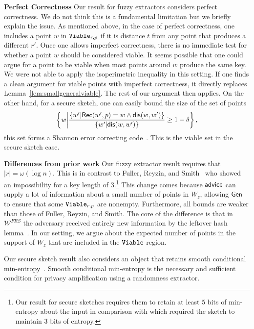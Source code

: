 \noindent \textbf{Perfect Correctness}
Our result for fuzzy extractors considers perfect correctness. We do not think this is a fundamental limitation but we briefly explain the issue. As mentioned above, in the case of perfect correctness, one includes a point $w$ in $\mathtt{Viable}_{r,p}$ if it is distance $t$ from any point that produces a different $r'$.  Once one allows imperfect correctness, there is no immediate test for whether a point $w$ should be considered viable. It seems possible that one could argue for a point to be viable when most points around $w$ produce the same key. We were not able to apply the isoperimetric inequality in this setting. If one finds a clean argument for viable points with imperfect correctness, it directly replaces Lemma~\ref{lem:smallgeneralviable}. The rest of our argument then applies. On the other hand, for a secure sketch, one can easily bound the size of the set of points \[ \left\{w \middle |  \frac{\{w' |{\mathsf{Rec}}(w', p) = w \wedge \mathsf{dis}(w, w')\}}{\{w' | \mathsf{dis}(w, w')\}}\ge 1-\delta \right\},\] this set forms a Shannon error correcting code~\cite[Lemma 7.3]{fuller2020fuzzy}. This is the viable set in the secure sketch case. 

\noindent
\textbf{Differences from prior work}
Our fuzzy extractor result requires that $|r| = \omega(\log n)$.  This is in contrast to Fuller, Reyzin, and Smith~\cite{fuller2020fuzzy} who showed an impossibility for a key length of $3$.\footnote{Our result for secure sketches requires them to retain at least $5$ bits of min-entropy about the input in comparison with \cite{fuller2020computational} which required the sketch to maintain $3$ bits of entropy.} This change comes because ${\mathsf{advice}}$ can supply a lot of information about a small number of points in $W_z$, allowing ${\mathsf{Gen}}$ to ensure that some $\mathtt{Viable}_{r,p}$ are nonempty. Furthermore, all bounds are weaker than those of Fuller, Reyzin, and Smith.  The core of the difference is that in $\mathcal{W}^{FRS}$ the adversary received entirely new information by the leftover hash lemma~\cite{haastad1993construction,barak2011leftover}. In our setting, we argue about the expected number of points in the support of $W_z$ that are included in the $\mathtt{Viable}$ region. 

Our secure sketch result also considers an object that retains smooth conditional min-entropy~\cite{renner2005simple}.  %
Smooth conditional min-entropy is the necessary and sufficient condition for privacy amplification using a randomness extractor. 



